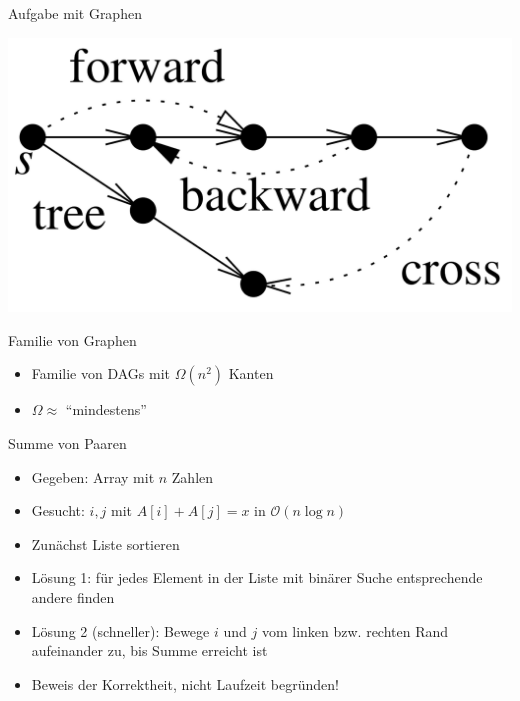 \begin{frame}{Aufgabe mit Graphen}
	\begin{center}
		\includegraphics[keepaspectratio,scale=0.25]{images/edges}
	\end{center}
\end{frame}

\begin{frame}{Familie von Graphen}
	\begin{itemize}
		\item Familie von DAGs mit $\Omega(n^2)$ Kanten
		\item $\Omega \approx$ "`mindestens"'
	\end{itemize}
\end{frame}

\begin{frame}{Summe von Paaren}
	\begin{itemize}
		\item Gegeben: Array mit $n$ Zahlen
		\item Gesucht: $i, j$ mit $A[i] + A[j] = x$ in $\mathcal{O}(n \log{n})$
		\item Zunächst Liste sortieren
		\item Lösung 1: für jedes Element in der Liste mit binärer Suche entsprechende andere finden
		\item Lösung 2 (schneller): Bewege $i$ und $j$ vom linken bzw. rechten Rand aufeinander zu, bis Summe erreicht ist
		\item Beweis der Korrektheit, nicht Laufzeit begründen!
	\end{itemize}
\end{frame}

